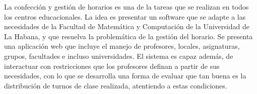 \begin{spanish_abstract}
	La confección y gestión de horarios es una de la tareas que se realizan en todos los centros educacionales. La idea es presentar un software que se adapte a las necesidades de la Facultad de Matemática y Computación de la Universidad de La Habana, y que resuelva la problemática de la gestión del horario. Se presenta una aplicación web que incluye el manejo de profesores, locales, asignaturas, grupos, facultades e incluso universidades. El sistema es capaz además, de interactuar con restricciones que los profesores definan a partir de sus necesidades, con lo que se desarrolla una forma de evaluar que tan buena es la distribución de turnos de clase realizada, atentiendo a estas condiciones.	
\end{spanish_abstract}


 